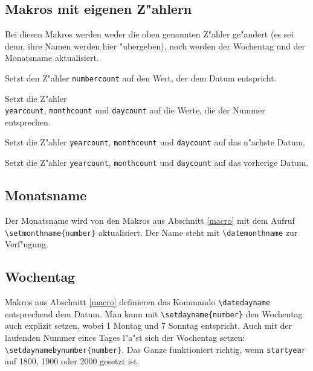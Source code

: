 \documentclass[a4paper,draft]{article}
\begin{document}
\subsection{Makros mit eigenen Z"ahlern}
Bei diesen Makros werden weder die oben genannten Z"ahler ge"andert (es sei denn, ihre Namen werden hier "ubergeben), noch werden der Wochentag und der Monatsname aktualisiert.
\begin{description}\sloppypar
\item[{\mdseries\textbackslash}\texttt{setmydatenumber}\{\texttt{numbercount}\}\{\texttt{year}\}\{\texttt{month}\}\{\texttt{day}\}:] Setzt den Z"ahler \texttt{numbercount} auf den Wert, der dem Datum entspricht.
\item[{\mdseries\textbackslash}\texttt{setmydatebynumber}\{\texttt{number}\}\{\texttt{yearcount}\}\{\texttt{monthcount}\}\{\texttt{daycount}\}:] Setzt die Z"ahler\\ \texttt{yearcount}, \texttt{monthcount} und \texttt{daycount} auf die Werte, die der Nummer entsprechen.
\item[{\mdseries\textbackslash}\texttt{mynextdate}\{\texttt{yearcount}\}\{\texttt{monthcount}\}\{\texttt{daycount}\}:] Setzt die Z"ahler \texttt{yearcount}, \texttt{monthcount} und \texttt{daycount} auf das n"achste Datum.
\item[{\mdseries\textbackslash}\texttt{mynextdate}\{\texttt{yearcount}\}\{\texttt{monthcount}\}\{\texttt{daycount}\}:] Setzt die Z"ahler \texttt{yearcount}, \texttt{monthcount} und \texttt{daycount} auf das vorherige Datum.
\end{description}

\subsection{Monatsname\label{monthname}}
Der Monatsname wird von den  Makros aus Abschnitt \ref{macro} mit dem Aufruf \verb+\setmonthname{number}+ aktualisiert. Der Name steht mit \verb+\datemonthname+ zur Verf"ugung.

\subsection{Wochentag\label{dayname}}
Makros aus Abschnitt \ref{macro} definieren das Kommando \verb+\datedayname+ entsprechend dem Datum. Man kann mit \verb+\setdayname{number}+ den Wochentag auch explizit setzen, wobei 1 Montag und 7 Sonntag entspricht. Auch mit der laufenden Nummer eines Tages l"a"st sich der Wochentag setzen: \verb+\setdaynamebynumber{number}+. Das Ganze funktioniert richtig, wenn \texttt{startyear} auf 1800, 1900 oder 2000 gesetzt ist.
\end{document}
